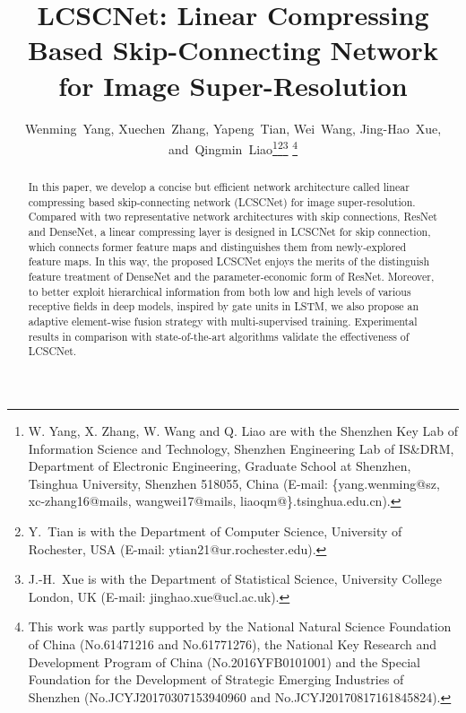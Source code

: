 \documentclass[journal]{IEEEtran}
\begin{document}
\title{LCSCNet: Linear Compressing Based Skip-Connecting Network\\ for Image Super-Resolution}

\author{Wenming~Yang,
        Xuechen~Zhang,
        Yapeng~Tian,
        Wei~Wang,
        Jing-Hao~Xue,
        and~Qingmin~Liao\thanks{W. Yang, X. Zhang, W. Wang and Q. Liao are with the Shenzhen Key Lab of Information Science and Technology, Shenzhen Engineering Lab of IS\&DRM, Department of Electronic Engineering, Graduate School at Shenzhen, Tsinghua University, Shenzhen 518055, China (E-mail: \{yang.wenming@sz, xc-zhang16@mails, wangwei17@mails, liaoqm@\}.tsinghua.edu.cn).}\thanks {Y.~Tian is with the Department of Computer Science, University of Rochester, USA (E-mail: ytian21@ur.rochester.edu).}\thanks {J.-H.~Xue is with the Department of Statistical Science, University College London, UK (E-mail: jinghao.xue@ucl.ac.uk).}
        \thanks{This work was partly supported by the National Natural Science Foundation of China (No.61471216 and No.61771276), the National Key Research and Development Program of China (No.2016YFB0101001) and the Special Foundation for the Development of Strategic Emerging Industries of Shenzhen (No.JCYJ20170307153940960 and No.JCYJ20170817161845824).}       
}

\maketitle


\begin{abstract}
In this paper, we develop a concise but efficient network architecture called linear compressing based skip-connecting network (LCSCNet) for image super-resolution. Compared with two representative network architectures with skip connections, ResNet and DenseNet, a linear compressing layer is designed in LCSCNet for skip connection, which connects former feature maps and distinguishes them from newly-explored feature maps.
In this way, the proposed LCSCNet enjoys the merits of the distinguish feature treatment of DenseNet and the parameter-economic form of ResNet. Moreover, to better exploit hierarchical information from both low and high levels of various receptive fields in deep models, inspired by gate units in LSTM, we also propose an adaptive element-wise fusion strategy with multi-supervised training. Experimental results in comparison with state-of-the-art algorithms validate the effectiveness of LCSCNet.
\end{abstract}
\end{document}
